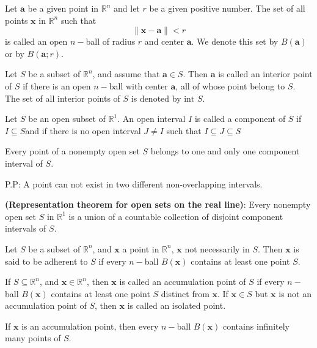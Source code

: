 \documentclass[10pt,a4paper]{book}
\begin{document}
\begin{deff}
Let $\mathbf{a}$ be a given point in $\mathbb{R}^n$ and let $r$ be a given positive number. The set of all points $\mathbf{x}$ in $\mathbb{R}^n$ such that
$$\lVert \mathbf{x} - \mathbf{a} \rVert < r$$
is called an open $n-$ball of radius $r$ and center $\mathbf{a}$. We denote this set by $B(\mathbf{a})$ or by $B(\mathbf{a};r)$.
\end{deff}
\begin{deff}
	Let $S$ be a subset of $\mathbb{R}^n$, and assume that $\mathbf{a} \in S$. Then $\mathbf{a}$ is called an interior point of $S$ if there is an open $n-$ball with center $\mathbf{a}$, all of whose point belong to $S$. The set of all interior points of $S$ is denoted by $\text{int } S$.
\end{deff}
\begin{deff}
	Let $S$ be an open subset of $\mathbb{R}^1$. An open interval $I$ is called a component of $S$ if $I \subseteq S $and if there is no open interval $J\neq I$ such that $I \subseteq J \subseteq S$
\end{deff}
\begin{Thm}
	Every point of a nonempty open set $S$ belongs to one and only one component interval of $S$.
\end{Thm}
\noindent P.P: A point can not exist in two different non-overlapping intervals.
\begin{Thm}
	\textbf{(Representation theorem for open sets  on the real line)}: Every nonempty open set $S$ in $\mathbb{R}^1$ is a union of a countable collection of disjoint component intervals of $S$.
\end{Thm}
\begin{deff}
	Let $S$ be a subset of $\mathbb{R}^n$, and $\mathbf{x}$ a point in $\mathbb{R}^n$, $\mathbf{x}$ not necessarily in $S$. Then $\mathbf{x}$ is said to be adherent to $S$ if every $n-$ball $B(\mathbf{x})$ contains at least one point $S$.
\end{deff}
\begin{deff}
	If $S \subseteq \mathbb{R}^n$, and $\mathbf{x} \in \mathbb{R}^n$, then $\mathbf{x}$  is called an accumulation point of $S$ if every $n-$ball $B(\mathbf{x})$ contains at least one point $S$ distinct from $\mathbf{x}$. If $\mathbf{x} \in S$ but $\mathbf{x}$ is not an accumulation point of $S$, then $\mathbf{x}$ is called an isolated point.
\end{deff}
\begin{Thm}
	If $\mathbf{x}$ is an accumulation point, then every $n-$ball $B(\mathbf{x})$ contains infinitely many points of $S$.
\end{Thm}
\end{document}
